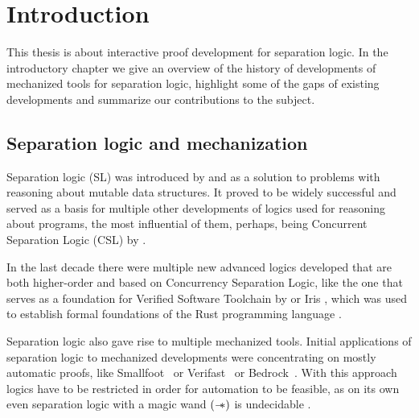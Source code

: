 \chapter{Introduction}

This thesis is about interactive proof development for separation logic.
In the introductory chapter we give an overview of the history of developments of mechanized tools for separation logic, highlight some of the gaps of existing developments and summarize our contributions to the subject.

\section{Separation logic and mechanization}
\label{sec:separation-logic-mechanization}

Separation logic (SL) was introduced by \citet{reynoldsSeparationLogicLogic2002} and
\citet{ohearnLocalReasoningPrograms2001} as a solution to problems with reasoning about mutable data structures.
It proved to be widely successful \cite{ohearnSeparationLogic2019} and served as a basis for multiple other developments of logics used for reasoning about programs, the most influential of them, perhaps, being Concurrent Separation Logic (CSL) by \citet{ohearnResourcesConcurrencyLocal2007}.

In the last decade there were multiple new advanced logics developed that are both higher-order and based on Concurrency Separation Logic, like the one that serves as a foundation for Verified Software Toolchain by \citet{appelProgramLogicsCertified2014} or Iris \cite{jungIrisGroundModular2018}, which was used to establish formal foundations of the Rust programming language \cite{jungRustBeltSecuringFoundations2018}.

Separation logic also gave rise to multiple mechanized tools.
Initial applications of separation logic to mechanized developments were concentrating on mostly automatic proofs, like Smallfoot~\cite{berdineSmallfootModularAutomatic2006} or Verifast~\cite{jacobsVeriFastProgramVerifier2008} or Bedrock~\cite{chlipalaMostlyautomatedVerificationLowlevel2011, chlipalaBedrockStructuredProgramming2013}.
With this approach logics have to be restricted in order for automation to be feasible, as on its own even separation logic with a magic wand \((\mathrel{-\mkern-6mu*})\) is undecidable \cite{brotherstonUndecidabilityPropositionalSeparation2014}.

